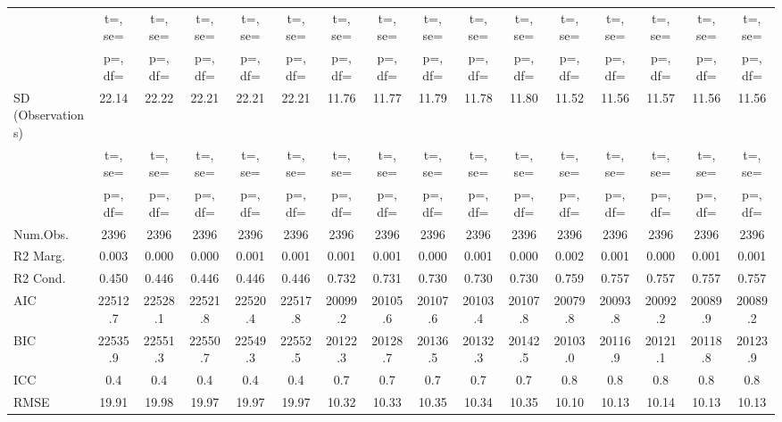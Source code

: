 \documentclass[]{report}
\begin{document}
\begin{table}
{\begin{tabular}[t]{lccccccccccccccc}
		& t=, se= & t=, se= & t=, se= & t=, se= & t=, se= & t=, se= & t=, se= & t=, se= & t=, se= & t=, se= & t=, se= & t=, se= & t=, se= & t=, se= & t=, \vphantom{1} se=\\
		& p=, df= & p=, df= & p=, df= & p=, df= & p=, df= & p=, df= & p=, df= & p=, df= & p=, df= & p=, df= & p=, df= & p=, df= & p=, df= & p=, df= & p=, \vphantom{1} df=\\
		SD (Observations) & \num{22.14} & \num{22.22} & \num{22.21} & \num{22.21} & \num{22.21} & \num{11.76} & \num{11.77} & \num{11.79} & \num{11.78} & \num{11.80} & \num{11.52} & \num{11.56} & \num{11.57} & \num{11.56} & \num{11.56}\\
		& t=, se= & t=, se= & t=, se= & t=, se= & t=, se= & t=, se= & t=, se= & t=, se= & t=, se= & t=, se= & t=, se= & t=, se= & t=, se= & t=, se= & t=, se=\\
		& p=, df= & p=, df= & p=, df= & p=, df= & p=, df= & p=, df= & p=, df= & p=, df= & p=, df= & p=, df= & p=, df= & p=, df= & p=, df= & p=, df= & p=, df=\\
		\midrule
		Num.Obs. & \num{2396} & \num{2396} & \num{2396} & \num{2396} & \num{2396} & \num{2396} & \num{2396} & \num{2396} & \num{2396} & \num{2396} & \num{2396} & \num{2396} & \num{2396} & \num{2396} & \num{2396}\\
		R2 Marg. & \num{0.003} & \num{0.000} & \num{0.000} & \num{0.001} & \num{0.001} & \num{0.001} & \num{0.001} & \num{0.000} & \num{0.001} & \num{0.000} & \num{0.002} & \num{0.001} & \num{0.000} & \num{0.001} & \num{0.001}\\
		R2 Cond. & \num{0.450} & \num{0.446} & \num{0.446} & \num{0.446} & \num{0.446} & \num{0.732} & \num{0.731} & \num{0.730} & \num{0.730} & \num{0.730} & \num{0.759} & \num{0.757} & \num{0.757} & \num{0.757} & \num{0.757}\\
		AIC & \num{22512.7} & \num{22528.1} & \num{22521.8} & \num{22520.4} & \num{22517.8} & \num{20099.2} & \num{20105.6} & \num{20107.6} & \num{20103.4} & \num{20107.8} & \num{20079.8} & \num{20093.8} & \num{20092.2} & \num{20089.9} & \num{20089.2}\\
		BIC & \num{22535.9} & \num{22551.3} & \num{22550.7} & \num{22549.3} & \num{22552.5} & \num{20122.3} & \num{20128.7} & \num{20136.5} & \num{20132.3} & \num{20142.5} & \num{20103.0} & \num{20116.9} & \num{20121.1} & \num{20118.8} & \num{20123.9}\\
		ICC & \num{0.4} & \num{0.4} & \num{0.4} & \num{0.4} & \num{0.4} & \num{0.7} & \num{0.7} & \num{0.7} & \num{0.7} & \num{0.7} & \num{0.8} & \num{0.8} & \num{0.8} & \num{0.8} & \num{0.8}\\
		RMSE & \num{19.91} & \num{19.98} & \num{19.97} & \num{19.97} & \num{19.97} & \num{10.32} & \num{10.33} & \num{10.35} & \num{10.34} & \num{10.35} & \num{10.10} & \num{10.13} & \num{10.14} & \num{10.13} & \num{10.13}\\
		\bottomrule
	\end{tabular}}
\end{table}
\end{document}
